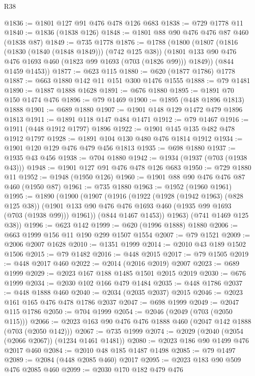 \begin{lexlean}{R38}
\begin{coremodule}
@1836 := @1801 @127 @91 @476 @478 @126 @683
@1838 := @729 @1778 @11
@1840 := @1836 (@1838 @126)
@1848 := @1801 @88 @90 @476 @476 @87 @460 (@1838 @87)
@1849 := @735 @1778
@1876 := @1788
    (@1800
      (@1807
        (@1816 (@1830 (@1840 (@1848 @1849))) (@742 @125 @38))
        (@1801 @133 @90 @476 @476 @1693 @460 (@1823 @99 @1693 (@703 (@1826 @99))) @1849))
      (@844 @1459 @1453))
@1877 := @623 @115
@1880 := @620 (@1877 @1786) @1778
@1887 := @663 @1880 @142 @11 @151 @300 @1476 @1555
@1888 := @79 @1481
@1890 := @1887 @1888 @1628
@1891 := @676 @1880
@1895 := @1891 @70 @150 @1474 @476
@1896 := @79 @1469
@1900 := @1895 (@448 @1896 @1813) @1888
@1901 := @689 @1880
@1907 := @1901 @148 @129 @1472 @479 @1896 @1813
@1911 := @1891 @118 @147 @484 @1471
@1912 := @79 @1467
@1916 := @1911 (@448 @1912 @1797) @1896
@1922 := @1901 @145 @135 @482 @478 @1912 @1797
@1928 := @1891 @104 @130 @480 @476 @1814 @1912
@1934 := @1901 @120 @129 @476 @479 @456 @1813
@1935 := @698 @1880
@1937 := @1935 @43 @456
@1938 := @704 @1880
@1942 := @1934 (@1937 (@703 (@1938 @43)))
@1948 := @1901 @127 @91 @476 @478 @126 @683
@1950 := @729 @1880 @11
@1952 := @1948 (@1950 @126)
@1960 := @1901 @88 @90 @476 @476 @87 @460 (@1950 @87)
@1961 := @735 @1880
@1963 := @1952 (@1960 @1961)
@1995 := @1890
    (@1900
      (@1907
        (@1916
          (@1922
            (@1928 (@1942 @1963) (@828 @125 @38))
            (@1901 @133 @90 @476 @476 @1693 @460 (@1935 @99 @1693 (@703 (@1938 @99))) @1961))
          (@844 @1467 @1453))
        @1963)
      (@741 @1469 @125 @38))
@1996 := @623 @142
@1999 := @620 (@1996 @1888) @1880
@2006 := @663 @1999 @156 @11 @190 @299 @1507 @1554
@2007 := @79 @1521
@2009 := @2006 @2007 @1628
@2010 := @1351 @1999
@2014 := @2010 @43 @189 @1502 @1506
@2015 := @79 @1482
@2016 := @448 @2015
@2017 := @79 @1505
@2019 := @448 @2017 @460
@2022 := @2014 (@2016 @2019) @2007
@2023 := @689 @1999
@2029 := @2023 @167 @188 @1485 @1501 @2015 @2019
@2030 := @676 @1999
@2034 := @2030 @102 @166 @479 @1484
@2035 := @448 @1786
@2037 := @448 @1888 @460
@2040 := @2034 (@2035 @2037) @2015
@2046 := @2023 @161 @165 @476 @478 @1786 @2037
@2047 := @698 @1999
@2049 := @2047 @115 @1786
@2050 := @704 @1999
@2054 := @2046 (@2049 (@703 (@2050 @115)))
@2066 := @2023 @163 @90 @476 @476 @1888 @460 (@2047 @142 @1888 (@703 (@2050 @142)))
@2067 := @735 @1999
@2074 := @2029 (@2040 (@2054 (@2066 @2067)) (@1234 @1461 @1481))
@2080 := @2023 @186 @90 @1499 @476 @2017 @460
@2084 := @2010 @48 @185 @1487 @1498
@2085 := @79 @1497
@2089 := @2084 (@448 @2085 @460) @2017
@2095 := @2023 @183 @90 @509 @476 @2085 @460
@2099 := @2030 @170 @182 @479 @476

\end{coremodule}
\end{lexlean}
